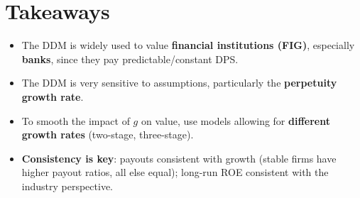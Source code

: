 \section{Takeaways}
\begin{itemize}
  \item The DDM is widely used to value \textbf{financial institutions (FIG)}, especially \textbf{banks}, since they pay predictable/constant DPS.
  \item The DDM is very sensitive to assumptions, particularly the \textbf{perpetuity growth rate}.
  \item To smooth the impact of $g$ on value, use models allowing for \textbf{different growth rates} (two-stage, three-stage).
  \item \textbf{Consistency is key}: payouts consistent with growth (stable firms have higher payout ratios, all else equal); long-run ROE consistent with the industry perspective.
\end{itemize}

